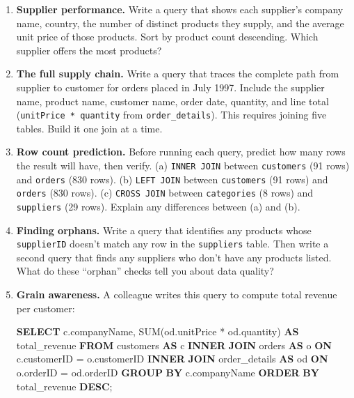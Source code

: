 \documentclass[
  letterpaper,
  DIV=11,
  numbers=noendperiod]{scrreprt}
\newenvironment{Shaded}{\begin{snugshade}}{\end{snugshade}}
\newcommand{\FunctionTok}[1]{\textcolor[rgb]{0.28,0.35,0.67}{#1}}
\newcommand{\KeywordTok}[1]{\textcolor[rgb]{0.00,0.23,0.31}{\textbf{#1}}}
\newcommand{\NormalTok}[1]{\textcolor[rgb]{0.00,0.23,0.31}{#1}}
\newcommand{\OperatorTok}[1]{\textcolor[rgb]{0.37,0.37,0.37}{#1}}
\begin{document}
\begin{enumerate}
\def\labelenumi{\arabic{enumi}.}
\item
  \textbf{Supplier performance.} Write a query that shows each
  supplier's company name, country, the number of distinct products they
  supply, and the average unit price of those products. Sort by product
  count descending. Which supplier offers the most products?
\item
  \textbf{The full supply chain.} Write a query that traces the complete
  path from supplier to customer for orders placed in July 1997. Include
  the supplier name, product name, customer name, order date, quantity,
  and line total (\texttt{unitPrice\ *\ quantity} from
  \texttt{order\_details}). This requires joining five tables. Build it
  one join at a time.
\item
  \textbf{Row count prediction.} Before running each query, predict how
  many rows the result will have, then verify. (a) \texttt{INNER\ JOIN}
  between \texttt{customers} (91 rows) and \texttt{orders} (830 rows).
  (b) \texttt{LEFT\ JOIN} between \texttt{customers} (91 rows) and
  \texttt{orders} (830 rows). (c) \texttt{CROSS\ JOIN} between
  \texttt{categories} (8 rows) and \texttt{suppliers} (29 rows). Explain
  any differences between (a) and (b).
\item
  \textbf{Finding orphans.} Write a query that identifies any products
  whose \texttt{supplierID} doesn't match any row in the
  \texttt{suppliers} table. Then write a second query that finds any
  suppliers who don't have any products listed. What do these ``orphan''
  checks tell you about data quality?
\item
  \textbf{Grain awareness.} A colleague writes this query to compute
  total revenue per customer:

  \begin{codelisting}

  \caption{\texttt{duckdb}}

\begin{Shaded}
\begin{Highlighting}[]
\KeywordTok{SELECT}
\NormalTok{    c.companyName,}
    \FunctionTok{SUM}\NormalTok{(od.unitPrice }\OperatorTok{*}\NormalTok{ od.quantity) }\KeywordTok{AS}\NormalTok{ total\_revenue}
\KeywordTok{FROM}\NormalTok{ customers }\KeywordTok{AS}\NormalTok{ c}
\KeywordTok{INNER} \KeywordTok{JOIN}\NormalTok{ orders }\KeywordTok{AS}\NormalTok{ o }\KeywordTok{ON}\NormalTok{ c.customerID }\OperatorTok{=}\NormalTok{ o.customerID}
\KeywordTok{INNER} \KeywordTok{JOIN}\NormalTok{ order\_details }\KeywordTok{AS}\NormalTok{ od }\KeywordTok{ON}\NormalTok{ o.orderID }\OperatorTok{=}\NormalTok{ od.orderID}
\KeywordTok{GROUP} \KeywordTok{BY}\NormalTok{ c.companyName}
\KeywordTok{ORDER} \KeywordTok{BY}\NormalTok{ total\_revenue }\KeywordTok{DESC}\NormalTok{;}
\end{Highlighting}
\end{Shaded}


\end{codelisting}
\end{enumerate}
\end{document}
